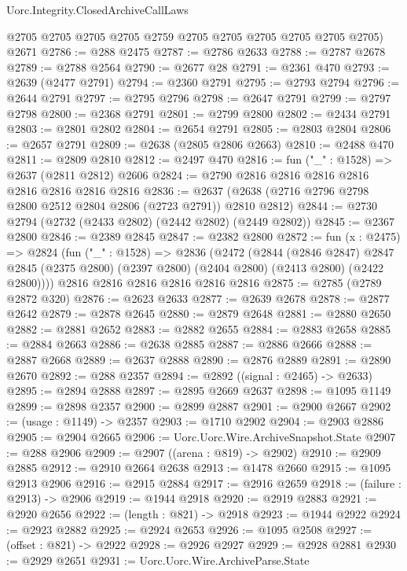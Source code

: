\begin{lexlean}{Uorc.Integrity.ClosedArchiveCallLaws}
\begin{coremodule}
      @2705
      @2705
      @2705
      @2705
      @2759
      @2705
      @2705
      @2705
      @2705
      @2705
      @2705)
    @2671
@2786 := @288 @2475
@2787 := @2786 @2633
@2788 := @2787 @2678
@2789 := @2788 @2564
@2790 := @2677 @28
@2791 := @2361 @470
@2793 := @2639 (@2477 @2791)
@2794 := @2360 @2791
@2795 := @2793 @2794
@2796 := @2644 @2791
@2797 := @2795 @2796
@2798 := @2647 @2791
@2799 := @2797 @2798
@2800 := @2368 @2791
@2801 := @2799 @2800
@2802 := @2434 @2791
@2803 := @2801 @2802
@2804 := @2654 @2791
@2805 := @2803 @2804
@2806 := @2657 @2791
@2809 := @2638 (@2805 @2806 @2663)
@2810 := @2488 @470
@2811 := @2809 @2810
@2812 := @2497 @470
@2816 := fun ("_" : @1528) => @2637 (@2811 @2812) @2606
@2824 := @2790 @2816 @2816 @2816 @2816 @2816 @2816 @2816 @2816
@2836 := @2637 (@2638 (@2716 @2796 @2798 @2800 @2512 @2804 @2806 (@2723 @2791)) @2810 @2812)
@2844 := @2730 @2794 (@2732 (@2433 @2802) (@2442 @2802) (@2449 @2802))
@2845 := @2367 @2800
@2846 := @2389 @2845
@2847 := @2382 @2800
@2872 := fun (x : @2475) =>
  @2824
    (fun ("_" : @1528) =>
    @2836
      (@2472
        (@2844
          (@2846 @2847)
          @2847
          @2845
          (@2375 @2800)
          (@2397 @2800)
          (@2404 @2800)
          (@2413 @2800)
          (@2422 @2800))))
    @2816
    @2816
    @2816
    @2816
    @2816
    @2816
@2875 := @2785 (@2789 @2872 @320)
@2876 := @2623 @2633
@2877 := @2639 @2678
@2878 := @2877 @2642
@2879 := @2878 @2645
@2880 := @2879 @2648
@2881 := @2880 @2650
@2882 := @2881 @2652
@2883 := @2882 @2655
@2884 := @2883 @2658
@2885 := @2884 @2663
@2886 := @2638 @2885
@2887 := @2886 @2666
@2888 := @2887 @2668
@2889 := @2637 @2888
@2890 := @2876 @2889
@2891 := @2890 @2670
@2892 := @288 @2357
@2894 := @2892 ((signal : @2465) -> @2633)
@2895 := @2894 @2888
@2897 := @2895 @2669 @2637
@2898 := @1095 @1149
@2899 := @2898 @2357
@2900 := @2899 @2887
@2901 := @2900 @2667
@2902 := (usage : @1149) -> @2357
@2903 := @1710 @2902
@2904 := @2903 @2886
@2905 := @2904 @2665
@2906 := Uorc.Uorc.Wire.ArchiveSnapshot.State
@2907 := @288 @2906
@2909 := @2907 ((arena : @819) -> @2902)
@2910 := @2909 @2885
@2912 := @2910 @2664 @2638
@2913 := @1478 @2660
@2915 := @1095 @2913 @2906
@2916 := @2915 @2884
@2917 := @2916 @2659
@2918 := (failure : @2913) -> @2906
@2919 := @1944 @2918
@2920 := @2919 @2883
@2921 := @2920 @2656
@2922 := (length : @821) -> @2918
@2923 := @1944 @2922
@2924 := @2923 @2882
@2925 := @2924 @2653
@2926 := @1095 @2508
@2927 := (offset : @821) -> @2922
@2928 := @2926 @2927
@2929 := @2928 @2881
@2930 := @2929 @2651
@2931 := Uorc.Uorc.Wire.ArchiveParse.State

\end{coremodule}
\end{lexlean}
